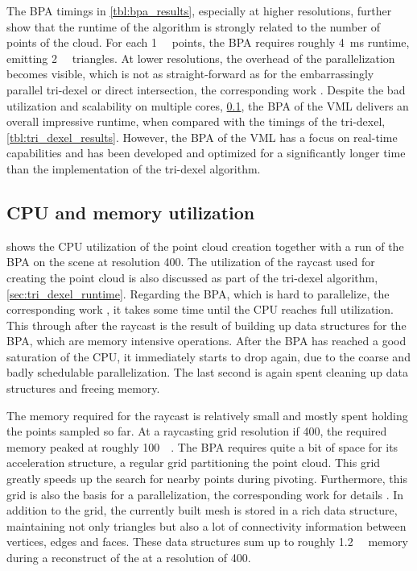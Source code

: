 The BPA timings in \cref{tbl:bpa_results}, especially at higher resolutions, further show that the runtime of the algorithm is strongly related to the number of points of the cloud.
For each \SI{1}{\kilo\nothing} points, the BPA requires roughly \SI{4}{\milli\second} runtime, emitting \SI{2}{\kilo\nothing} triangles.
At lower resolutions, the overhead of the parallelization becomes visible, which is not as straight-forward as for the embarrassingly parallel tri-dexel or direct intersection, \cf the corresponding work \cite{bpa_vml}.
Despite the bad utilization and scalability on multiple cores, \cf \cref{sec:bpa_utilization}, the BPA of the VML delivers an overall impressive runtime, when compared with the timings of \eg the tri-dexel, \cf \cref{tbl:tri_dexel_results}.
However, the BPA of the VML has a focus on real-time capabilities and has been developed and optimized for a significantly longer time than the implementation of the tri-dexel algorithm.


\subsection{CPU and memory utilization}
\label{sec:bpa_utilization}

 shows the CPU utilization of the point cloud creation together with a run of the BPA on the \impeller scene at resolution 400.
The utilization of the raycast used for creating the point cloud is also discussed as part of the tri-dexel algorithm, \cf \cref{sec:tri_dexel_runtime}.
Regarding the BPA, which is hard to parallelize, \cf the corresponding work \cite{bpa_vml}, it takes some time until the CPU reaches full utilization.
This through after the raycast is the result of building up data structures for the BPA, which are memory intensive operations.
After the BPA has reached a good saturation of the CPU, it immediately starts to drop again, due to the coarse and badly schedulable parallelization.
The last second is again spent cleaning up data structures and freeing memory.

The memory required for the raycast is relatively small and mostly spent holding the points sampled so far.
At a raycasting grid resolution if 400, the required memory peaked at roughly \SI{100}{\mebi\byte}.
The BPA requires quite a bit of space for its acceleration structure, a regular grid partitioning the point cloud.
This grid greatly speeds up the search for nearby points during pivoting.
Furthermore, this grid is also the basis for a parallelization, \cf the corresponding work for details \cite{bpa_vml}.
In addition to the grid, the currently built mesh is stored in a rich data structure, maintaining not only triangles but also a lot of connectivity information between vertices, edges and faces.
These data structures sum up to roughly \SI{1.2}{\gibi\byte} memory during a reconstruct of the \impeller at a resolution of 400.


